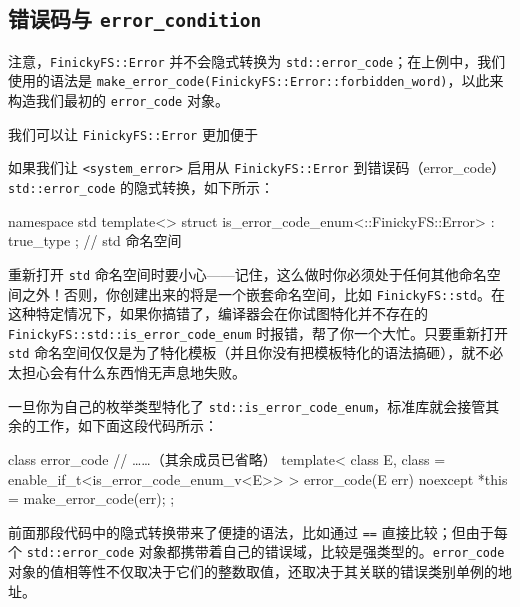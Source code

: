 \subsection{错误码与 \texttt{error\_\allowbreak{}condition}}

注意，\texttt{Finicky\allowbreak{}FS::\allowbreak{}Error} 并不会隐式转换为 \texttt{std::\allowbreak{}error\_\allowbreak{}code}；在上例中，我们使用的语法是 \texttt{make\_\allowbreak{}error\_\allowbreak{}code(\allowbreak{}Finicky\allowbreak{}FS::\allowbreak{}Error::\allowbreak{}forbidden\_\allowbreak{}word)\allowbreak{}}，以此来构造我们最初的 \texttt{error\_\allowbreak{}code} 对象。

我们可以让 \texttt{Finicky\allowbreak{}FS::\allowbreak{}Error} 更加便于

如果我们让 \texttt{<system\_\allowbreak{}error>\allowbreak{}} 启用从 \texttt{Finicky\allowbreak{}FS::\allowbreak{}Error} 到错误码（error\_\allowbreak{}code）\texttt{std::\allowbreak{}error\_\allowbreak{}code} 的隐式转换，如下所示：

\begin{codebox}[cpp]
     namespace std {
     template<>
     struct is_error_code_enum<::FinickyFS::Error> : true_type {};
     } // std 命名空间
\end{codebox}

重新打开 \texttt{std} 命名空间时要小心——记住，这么做时你必须处于任何其他命名空间之外！否则，你创建出来的将是一个嵌套命名空间，比如 \texttt{Finicky\allowbreak{}FS::\allowbreak{}std}。在这种特定情况下，如果你搞错了，编译器会在你试图特化并不存在的 \texttt{Finicky\allowbreak{}FS::\allowbreak{}std::\allowbreak{}is\_\allowbreak{}error\_\allowbreak{}code\_\allowbreak{}enum} 时报错，帮了你一个大忙。只要重新打开 \texttt{std} 命名空间仅仅是为了特化模板（并且你没有把模板特化的语法搞砸），就不必太担心会有什么东西悄无声息地失败。

一旦你为自己的枚举类型特化了 \texttt{std::\allowbreak{}is\_\allowbreak{}error\_\allowbreak{}code\_\allowbreak{}enum}，标准库就会接管其余的工作，如下面这段代码所示：

\begin{codebox}[cpp]
     class error_code {
       // ……（其余成员已省略）
       template<
         class E,
         class = enable_if_t<is_error_code_enum_v<E>>
       >
       error_code(E err) noexcept {
         *this = make_error_code(err);
       }
     };
\end{codebox}

前面那段代码中的隐式转换带来了便捷的语法，比如通过 \texttt{==} 直接比较；但由于每个 \texttt{std::\allowbreak{}error\_\allowbreak{}code} 对象都携带着自己的错误域，比较是强类型的。\texttt{error\_\allowbreak{}code} 对象的值相等性不仅取决于它们的整数取值，还取决于其关联的错误类别单例的地址。

